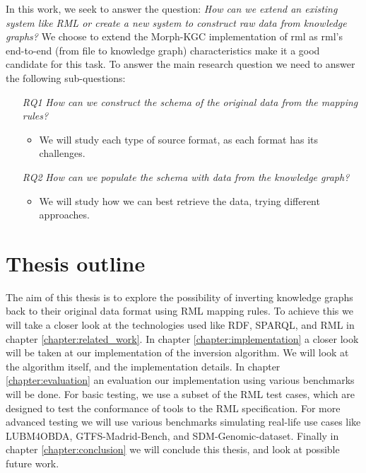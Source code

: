 In this work, we seek to answer the question: \textit{How can we extend an existing system like RML or create a new system to construct raw data from knowledge graphs?} We choose to extend the Morph-KGC implementation \citep{arenas2022morph} of \acrshort{rml} \citep{dimou_ldow_2014} as \acrshort{rml}'s end-to-end (from file to knowledge graph) characteristics make it a good candidate for this task. To answer the main research question we need to answer the following sub-questions:
\begin{itemize}
    \item[\textit{RQ1}] \textit{How can we construct the schema of the original data from the mapping rules?}
    \begin{itemize}
        \item We will study each type of source format, as each format has its challenges.
    \end{itemize}
    \item[\textit{RQ2}] \textit{How can we populate the schema with data from the knowledge graph?}
    \begin{itemize}
        \item We will study how we can best retrieve the data, trying different approaches.
    \end{itemize}
\end{itemize}

\section{Thesis outline}
The aim of this thesis is to explore the possibility of inverting knowledge graphs back to their original data format using RML mapping rules. To achieve this we will take a closer look at the technologies used like RDF, SPARQL, and RML in chapter \ref{chapter:related_work}. %
In chapter \ref{chapter:implementation} a closer look will be taken at our implementation of the inversion algorithm. We will look at the algorithm itself, and the implementation details. 
In chapter \ref{chapter:evaluation} an evaluation our implementation using various benchmarks will be done. For basic testing, we use a subset of the RML test cases, which are designed to test the conformance of tools to the RML specification. For more advanced testing we will use various benchmarks simulating real-life use cases like LUBM4OBDA, GTFS-Madrid-Bench, and SDM-Genomic-dataset. Finally in chapter \ref{chapter:conclusion} we will conclude this thesis, and look at possible future work.

